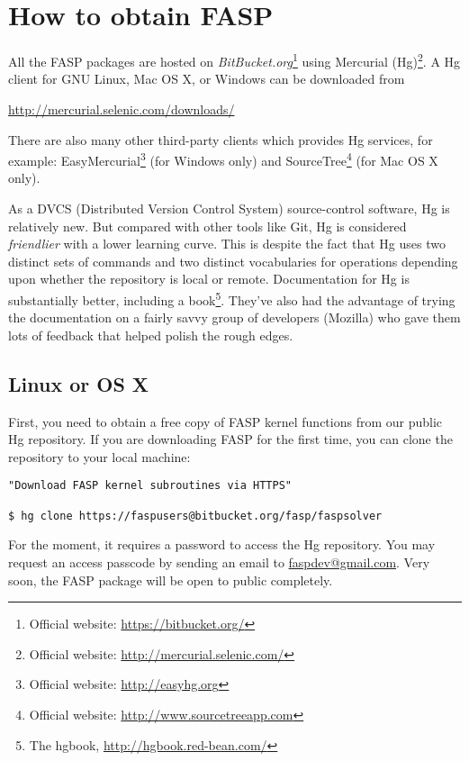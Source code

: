 \documentclass[11pt]{memoir}
\begin{document}
\section{How to obtain FASP}\label{sec:install}

All the FASP packages are hosted on \emph{BitBucket.org}\footnote{Official website: \url{https://bitbucket.org/}} using Mercurial (Hg)\footnote{Official website: \url{http://mercurial.selenic.com/}}. A Hg client for GNU Linux, Mac OS X, or Windows can be downloaded from
\begin{center}
  \url{http://mercurial.selenic.com/downloads/}
\end{center}
%
There are also many other third-party clients which provides Hg services, for example: EasyMercurial\footnote{Official website: \url{http://easyhg.org}} (for Windows only) and SourceTree\footnote{Official website: \url{http://www.sourcetreeapp.com}} (for Mac OS X only).

As a DVCS (Distributed Version Control System) source-control software, Hg is relatively new. But compared with other tools like Git, Hg is considered \emph{friendlier} with a lower learning curve. This is despite the fact that Hg uses two distinct sets of commands and two distinct vocabularies for operations depending upon whether the repository is local or remote.
Documentation for Hg is substantially better, including a book\footnote{The hgbook, \url{http://hgbook.red-bean.com/}}. They've also had the advantage of trying the documentation on a fairly savvy group of developers (Mozilla) who gave them lots of feedback that helped polish the rough edges.

\subsection{Linux or OS X}
First, you need to obtain a free copy of FASP kernel functions from our public Hg repository. If you are downloading FASP for the first time, you can clone the repository to your local machine:
%
\begin{lstlisting}[numbers=none]
"Download FASP kernel subroutines via HTTPS"

$ hg clone https://faspusers@bitbucket.org/fasp/faspsolver
\end{lstlisting}
%
\begin{snugshade}\noindent
For the moment, it requires a password to access the Hg repository. You may request an access passcode by sending an email to \url{faspdev@gmail.com}. Very soon, the FASP package will be open to public completely.
\end{snugshade}
\end{document}
